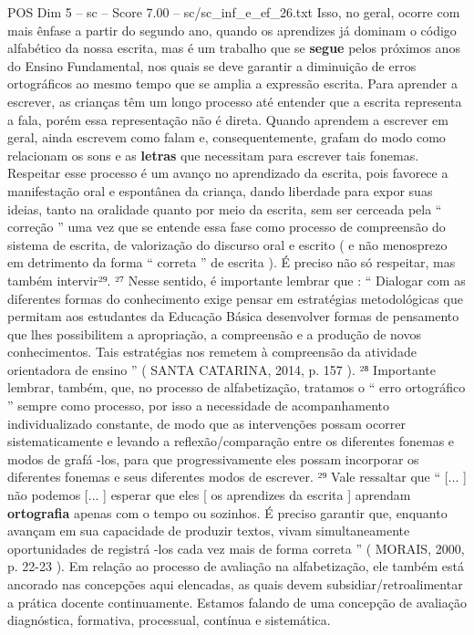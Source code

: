 \begin{textsample}{POS Dim 5 – sc – Score 7.00 – sc/sc\_inf\_e\_ef\_26.txt}
Isso, no geral, ocorre com mais ênfase a partir do segundo ano, quando os aprendizes já dominam o código alfabético da nossa escrita, mas é um trabalho que se \textbf{segue} pelos próximos anos do Ensino Fundamental, nos quais se deve garantir a diminuição de erros ortográficos ao mesmo tempo que se amplia a expressão escrita.
Para aprender a escrever, as crianças têm um longo processo até entender que a escrita representa a fala, porém essa representação não é direta.
Quando aprendem a escrever em geral, ainda escrevem como falam e, consequentemente, grafam do modo como relacionam os sons e as \textbf{letras} que necessitam para escrever tais fonemas.
Respeitar esse processo é um avanço no aprendizado da escrita, pois favorece a manifestação oral e espontânea da criança, dando liberdade para expor suas ideias, tanto na oralidade quanto por meio da escrita, sem ser cerceada pela “ correção ” uma vez que se entende essa fase como processo de compreensão do sistema de escrita, de valorização do discurso oral e escrito ( e não menosprezo em detrimento da forma “ correta ” de escrita ).
É preciso não só respeitar, mas também intervir²⁹. ²⁷ Nesse sentido, é importante lembrar que : “ Dialogar com as diferentes formas do conhecimento exige pensar em estratégias metodológicas que permitam aos estudantes da Educação Básica desenvolver formas de pensamento que lhes possibilitem a apropriação, a compreensão e a produção de novos conhecimentos.
Tais estratégias nos remetem à compreensão da atividade orientadora de ensino ” ( SANTA CATARINA, 2014, p. 157 ). ²⁸ Importante lembrar, também, que, no processo de alfabetização, tratamos o “ erro ortográfico ” sempre como processo, por isso a necessidade de acompanhamento individualizado constante, de modo que as intervenções possam ocorrer sistematicamente e levando a reflexão/comparação entre os diferentes fonemas e modos de grafá -los, para que progressivamente eles possam incorporar os diferentes fonemas e seus diferentes modos de escrever. ²⁹ Vale ressaltar que “ [... ] não podemos [... ] esperar que eles [ os aprendizes da escrita ] aprendam \textbf{ortografia} apenas com o tempo ou sozinhos.
É preciso garantir que, enquanto avançam em sua capacidade de produzir textos, vivam simultaneamente oportunidades de registrá -los cada vez mais de forma correta ” ( MORAIS, 2000, p. 22-23 ).
Em relação ao processo de avaliação na alfabetização, ele também está ancorado nas concepções aqui elencadas, as quais devem subsidiar/retroalimentar a prática docente continuamente.
Estamos falando de uma concepção de avaliação diagnóstica, formativa, processual, contínua e sistemática.

\end{textsample}
